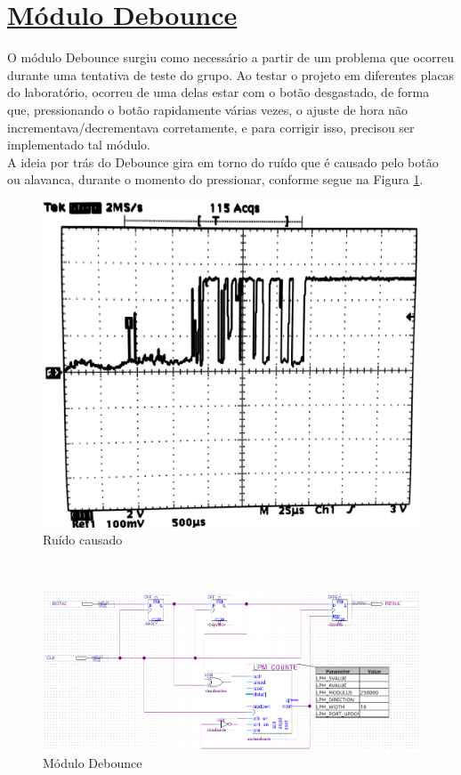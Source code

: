 \documentclass[14pt, oneside]{book}
\newcommand\tab[1][1cm]{\hspace*{#1}}
\theoremstyle{definition}
\begin{document}
            \section[Módulo Debounce]{\hyperlink{toc}{Módulo Debounce}}
                \tab O módulo Debounce surgiu como necessário a partir de um problema que ocorreu durante uma tentativa de teste do grupo. Ao testar o projeto em diferentes placas do laboratório, ocorreu de uma delas estar com o botão desgastado, de forma que, pressionando o botão rapidamente várias vezes, o ajuste de hora não incrementava/decrementava corretamente, e para corrigir isso, precisou ser implementado tal módulo. \\
                \tab A ideia por trás do Debounce gira em torno do ruído que é causado pelo botão ou alavanca, durante o momento do pressionar, conforme segue na Figura \ref{fig:debounce2}. \\
                \begin{figure}[!htb]
                    \centering
                    \includegraphics[scale=0.2]{debouncezao.png}
                    \caption{Ruído causado}
                    \label{fig:debounce2}
                \end{figure} \\
                \begin{figure}[!h]
                    \centering
                    \includegraphics[scale=0.85]{debounce.png}
                    \caption{Módulo Debounce}
                    \label{fig:debounce}
                \end{figure} \\
\end{document}
